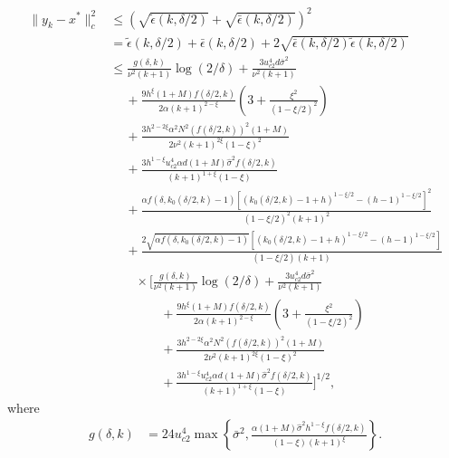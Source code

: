 \documentclass[letterpaper, 10 pt]{article}
\begin{document}
\begin{align*}
    \|y_k-x^*\|^2_c &\leq \left( \sqrt{\tilde{\epsilon}(k,\delta/2)} + \sqrt{\bar{\epsilon}(k,\delta/2)}\right)^2\\
    &=  \tilde{\epsilon}(k,\delta/2) + \bar{\epsilon}(k,\delta/2) + 2\sqrt{\bar{\epsilon}(k,\delta/2)\tilde{\epsilon}(k,\delta/2)}\\
    &\leq \frac{g(\delta,k)}{\nu^2(k+1)}\log (2/\delta) + \frac{3u_{c2}^4d \bar{\sigma}^2}{\nu^2(k+1)} \nonumber\\
    &\quad~+ \frac{9 h^\xi(1+M) f(\delta/2,k)}{2\alpha (k+1)^{2-\xi}} \left( 3 +\frac{\xi^2}{(1-\xi/2)^2} \right) \nonumber\\
    &\quad~+ \frac{3h^{2-2\xi}\alpha^2 N^2 (f(\delta/2,k))^2(1+M)}{2\nu^2(k+1)^{2\xi}(1-\xi)^2} \nonumber\\
    &\quad~+ \frac{3h^{1-\xi}u_{c2}^4\alpha d(1+M)\hat{\sigma}^2f(\delta/2,k)}{(k+1)^{1+\xi}(1-\xi)} \\
    &\quad~+\frac{\alpha f(\delta,k_0(\delta/2,k)-1)\left[(k_0(\delta/2,k)-1+h)^{1-\xi/2}-(h-1)^{1-\xi/2}\right]^2}{(1-\xi/2)^2(k+1)^{2}}\\
    &\quad~+  \frac{2\sqrt{\alpha f(\delta,k_0(\delta/2,k)-1)}\left[(k_0(\delta/2,k)-1+h)^{1-\xi/2}-(h-1)^{1-\xi/2}\right]}{(1-\xi/2)(k+1)} \\
    &\quad\quad\times\Bigg[ \frac{g(\delta,k)}{\nu^2(k+1)}\log (2/\delta) + \frac{3u_{c2}^4d \bar{\sigma}^2}{\nu^2(k+1)} \nonumber\\
    &\quad\quad\quad \quad+ \frac{9 h^\xi(1+M) f(\delta/2,k)}{2\alpha (k+1)^{2-\xi}} \left( 3 +\frac{\xi^2}{(1-\xi/2)^2} \right) \nonumber\\
    &\quad\quad\quad \quad+ \frac{3h^{2-2\xi}\alpha^2 N^2 (f(\delta/2,k))^2(1+M)}{2\nu^2(k+1)^{2\xi}(1-\xi)^2} \nonumber\\
    &\quad\quad\quad \quad+ \frac{3h^{1-\xi}u_{c2}^4\alpha d(1+M)\hat{\sigma}^2f(\delta/2,k)}{(k+1)^{1+\xi}(1-\xi)}\Bigg]^{1/2},
\end{align*}
where
\begin{align*}
    g(\delta,k) &= 24u_{c2}^4\max \left\{\bar{\sigma}^2, \frac{\alpha (1+M)\hat{\sigma}^2h^{1-\xi}f(\delta/2,k)}{(1-\xi)(k+1)^\xi}\right\}.
\end{align*} 
\end{document}
